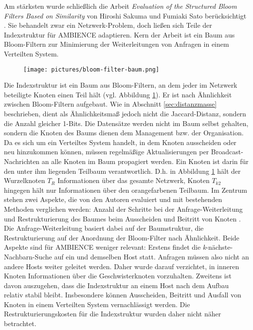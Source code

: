 Am stärksten wurde schließlich die Arbeit \textit{Evaluation of the Structured Bloom Filters Based on Similarity} von Hiroshi Sakuma und Fumiaki Sato berücksichtigt \cite{Sakuma2011}. Sie behandelt zwar ein Netzwerk-Problem, doch ließen sich Teile der Indexstruktur für AMBIENCE adaptieren. Kern der Arbeit ist ein Baum aus Bloom-Filtern zur Minimierung der Weiterleitungen von Anfragen in einem Verteilten System. 
\begin{figure}[hpbt]
  \centering
  \label{fig:pic5}
  \texttt{[image: pictures/bloom-filter-baum.png]}
\end{figure}
Die Indexstruktur ist ein Baum aus Bloom-Filtern, an dem jeder im Netzwerk beteiligte Knoten einen Teil hält (vgl. Abbildung \ref{fig:pic5}). Er ist nach Ähnlichkeit zwischen Bloom-Filtern aufgebaut. Wie in Abschnitt \ref{sec:distanzmasse} beschrieben, dient als Ähnlichkeitsmaß jedoch nicht die Jaccard-Distanz, sondern die Anzahl gleicher 1-Bits. Die Datensätze werden nicht im Baum selbst gehalten, sondern die Knoten des Baums dienen dem Management bzw. der Organisation. Da es sich um ein Verteiltes System handelt, in dem Knoten ausscheiden oder neu hinzukommen können, müssen regelmäßige Aktualisierungen per Broadcast-Nachrichten an alle Knoten im Baum propagiert werden. Ein Knoten ist darin für den unter ihm liegenden Teilbaum verantwortlich. D.h. in Abbildung \ref{fig:pic5} hält der Wurzelknoten $T_R$ Informationen über das gesamte Netzwerk, Knoten $T_{k2}$ hingegen hält nur Informationen über den orangefarbenen Teilbaum. 
\newpage
\noindent
Im Zentrum stehen zwei Aspekte, die von den Autoren evaluiert und mit bestehenden Methoden verglichen werden: Anzahl der Schritte bei der Anfrage-Weiterleitung und Restrukturierung des Baumes beim Ausscheiden und Beitritt von Knoten \cite{Sakuma2011}. Die Anfrage-Weiterleitung basiert dabei auf der Baumstruktur, die Restrukturierung auf der Anordnung der Bloom-Filter nach Ähnlichkeit. Beide Aspekte sind für AMBIENCE weniger relevant: Erstens findet die \textit{k}-nächste-Nachbarn-Suche auf ein und demselben Host statt. Anfragen müssen also nicht an andere Hosts weiter geleitet werden. Daher wurde darauf verzichtet, in inneren Knoten Informationen über die Geschwisterknoten vorzuhalten. Zweitens ist davon auszugehen, dass die Indexstruktur an einem Host nach dem Aufbau relativ stabil bleibt. Insbesondere können Ausscheiden, Beitritt und Ausfall von Knoten in einem Verteilten System vernachlässigt werden. Die Restrukturierungskosten für die Indexstruktur wurden daher nicht näher betrachtet.  

